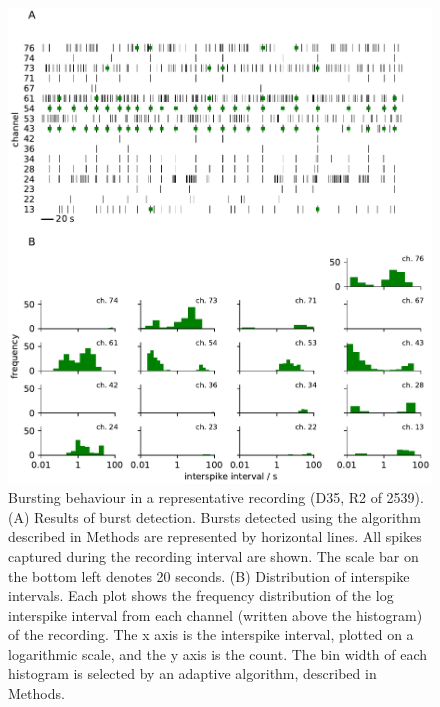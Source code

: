 \documentclass[doublespacing]{bmcart}
\begin{document}
\begin{backmatter}
\begin{figure}[h!]
  \includegraphics{../plots/supplementary_figures/isi_and_burst_example.pdf}
	\caption{Bursting behaviour in a representative recording (D35, R2 of 2539). (A) Results of burst detection. Bursts detected using the algorithm described in Methods are represented by horizontal lines. All spikes captured during the recording interval are shown. The scale bar on the bottom left denotes 20 seconds. (B) Distribution of interspike intervals. Each plot shows the frequency distribution of the log interspike interval from each channel (written above the histogram) of the recording.  The x axis is the interspike interval, plotted on a logarithmic scale, and the y axis is the count. The bin width of each histogram is selected by an adaptive algorithm, described in Methods.}
	\label{fig:logisi}
\end{figure}


\end{backmatter}
\end{document}
